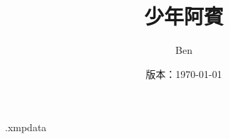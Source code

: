\begin{filecontents*}{\jobname.xmpdata}
\end{filecontents*}

\documentclass{ctexbook}
\setmainfont{Source Han Serif TW}
\usepackage[a-1b]{pdfx}



\title{{\bfseries 少年阿賓}}
\author{Ben}
\date{版本：\today}
\maketitle
\chapter*{作者有一點話說}

\part{Three Amigo}
\chapter{Candy}
\chapter{筠夢}
\chapter{羚羚}
\part{少年阿賓}
\chapter{房東太太}
\chapter{學姐}
\chapter{初識鈺慧}
\chapter{迷亂舞會}
